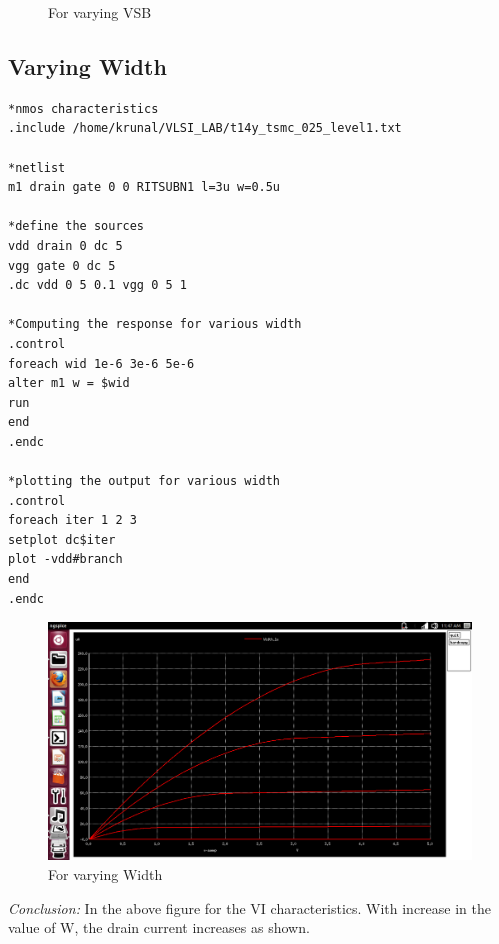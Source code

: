 \documentclass[12pt,a4paper]{article}
\begin{document}
\begin{center}
\begin{figure}[!ht]
\caption[Short]{For varying VSB}
\end{figure}

\subsection{Varying Width}

\begin{lstlisting}
*nmos characteristics
.include /home/krunal/VLSI_LAB/t14y_tsmc_025_level1.txt

*netlist
m1 drain gate 0 0 RITSUBN1 l=3u w=0.5u

*define the sources
vdd drain 0 dc 5
vgg gate 0 dc 5
.dc vdd 0 5 0.1 vgg 0 5 1

*Computing the response for various width
.control
foreach wid 1e-6 3e-6 5e-6
alter m1 w = $wid
run 
end
.endc

*plotting the output for various width
.control
foreach iter 1 2 3
setplot dc$iter
plot -vdd#branch
end
.endc
\end{lstlisting}

\begin{figure}[!ht]
\centering
\includegraphics[scale=0.34]{width_1a.png}
\caption[Short]{For varying Width}
\end{figure}

\textit{Conclusion:}  In the above figure for the VI characteristics. With increase in the value of W, the drain current increases as shown. 
\vspace{3pt}


\end{center}
\end{document}
